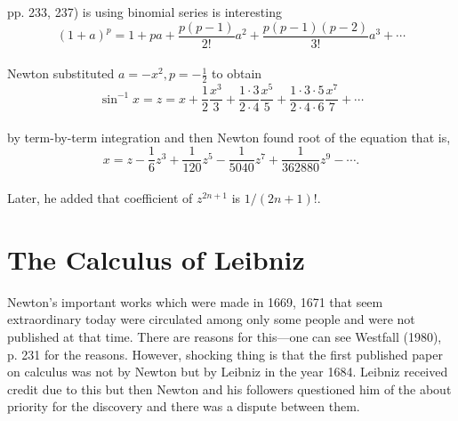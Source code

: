\documentclass[a4paper,reqno,11pt]{book}
\theoremstyle{plain}%
\theoremstyle{definition}
\begin{document}
pp. 233, 237) is using binomial series is interesting\\
$$(1+a)^p =  1 + pa + \frac{p(p-1)}{2!}a^2 + \frac{p(p-1)(p-2)}{3!}a^3 + \cdots$$\\
Newton substituted $a = -x^2, p = -\frac{1}{2} $ to obtain\\ 
$$ \sin^{-1}x = z = x + \frac{1}{2}\frac{x^3}{3} + \frac{1\cdot3}{2\cdot4}\frac{x^5}{5} + \frac{1\cdot3\cdot5}{2\cdot4\cdot6}\frac{x^7}{7} + \cdots$$\\
by term-by-term integration and then Newton found root of the equation that is,\\
$$x = z - \frac{1}{6}z^3 + \frac{1}{120}z^5 - \frac{1}{5040}z^7 + \frac{1}{362880}z^9 - \cdots.$$\\
Later, he added that coefficient of $z^{2n+1}$ is $1/(2n+1)!.$
\section{The Calculus of Leibniz}
Newton’s important works which were made in 1669, 1671 that seem extraordinary today were circulated among only some people and were not published
at that time. There are reasons for this—one can see Westfall (1980), p. 231 for the reasons. However, shocking thing is that the first published paper on calculus was not by Newton but
by Leibniz in the year 1684. Leibniz received credit due to this but then Newton and his followers questioned him of the about priority for the discovery and there was a dispute between them.\\
\end{document}
